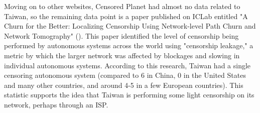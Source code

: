 Moving on to other websites, Censored Planet had almost no data related to Taiwan, so the remaining data point is a paper published on ICLab entitled
"A Churn for the Better: Localizing Censorship Using Network-level Path Churn and Network Tomography" (\cite{Cho_CoNEXT17}). This paper identified the level
of censorship being performed by autonomous systems across the world using "censorship leakage," a metric by which the larger network was affected by blockages
and slowing in individual autonomous systems. According to this research, Taiwan had a single censoring autonomous system (compared to 6 in China, 0 in the
United States and many other countries, and around 4-5 in a few European countries). This statistic supports the idea that Taiwan is performing some light
censorship on its network, perhaps through an ISP.